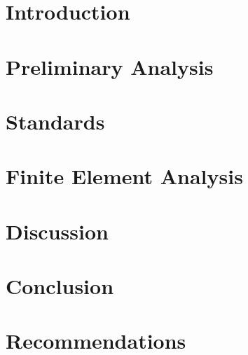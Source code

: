 
\chapter{Introduction}
	

\chapter{Preliminary Analysis}
	
	
\chapter{Standards}
	

\chapter{Finite Element Analysis}
	

\chapter{Discussion}
	

\chapter{Conclusion}
	

\chapter{Recommendations}
	

%	